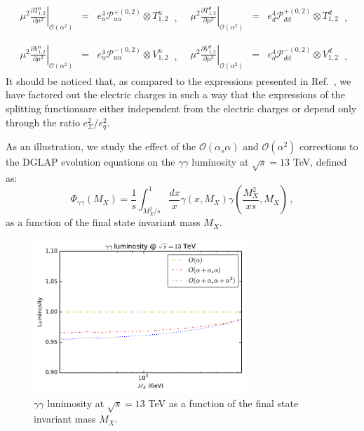 \begin{widetext}
\begin{equation}
\begin{array}{ll}
\begin{array}{rcl}
\displaystyle \left.\mu^2\frac{\partial T^u_{1,2}}{\partial \mu^2}\right|_{\mathcal{O}(\alpha^2)} &=&
\displaystyle e_u^4\mathcal{P}_{uu}^{+(0,2)}\otimes T^u_{1,2}
\end{array}\,, &
\begin{array}{rcl}
\displaystyle \left.\mu^2\frac{\partial T^d_{1,2}}{\partial \mu^2}\right|_{\mathcal{O}(\alpha^2)} &=&
\displaystyle e_d^4\mathcal{P}_{dd}^{+(0,2)} \otimes T^d_{1,2}
\end{array}\,,
\\
\\
\begin{array}{rcl}
\displaystyle \left.\mu^2\frac{\partial V^u_{1,2}}{\partial \mu^2}\right|_{\mathcal{O}(\alpha^2)} &=&
\displaystyle e_u^4\mathcal{P}_{uu}^{-(0,2)} \otimes V^u_{1,2}
\end{array}\,, &
\begin{array}{rcl}
\displaystyle \left.\mu^2\frac{\partial V^d_{1,2}}{\partial \mu^2}\right|_{\mathcal{O}(\alpha^2)} &=&
\displaystyle e_d^4\mathcal{P}_{dd}^{-(0,2)}\otimes V^d_{1,2}
\end{array}\,.
\end{array}
\end{equation}
It should be noticed that, as compared to the expressions presented in
Ref.~\cite{deFlorian:2016gvk}, we have factored out the electric
charges in such a way that the expressions of the splitting
functionsare either independent from the electric charges or depend
only through the ratio $e_\Sigma^2/e_q^2$.

As an illustration, we study the effect of the
$\mathcal{O}(\alpha_s\alpha)$ and $\mathcal{O}(\alpha^2)$ corrections
to the DGLAP evolution equations on the $\gamma\gamma$ luminosity at
$\sqrt{s} = 13$ TeV, defined as:
\begin{equation}\label{eq:GammaGammaLumi}
\Phi_{\gamma\gamma}(M_X) = \frac1{s}\int_{M_X^2/s}^1
\frac{dx}{x} \gamma(x,M_X) \gamma\left(\frac{M_X^2}{xs},M_X\right)\,,
\end{equation}
as a function of the final state invariant mass $M_X$.
\begin{figure}[h]
\includegraphics[width=8cm]{figs/lumi_13tev.pdf} 
\caption{$\gamma\gamma$ lunimosity at $\sqrt{s} = 13$ TeV as a
  function of the final state invariant mass $M_X$.}
\label{fig:GammaGammaLumi}
\end{figure}


\end{widetext}
